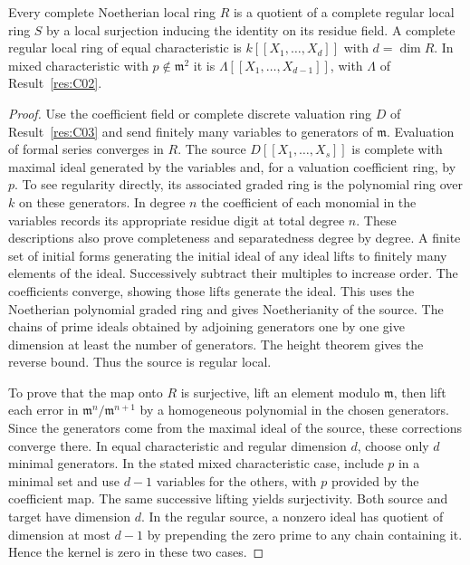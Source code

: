 \begin{theorem}\label{res:C04}
Every complete Noetherian local ring \(R\) is a quotient of a
complete regular local ring \(S\) by a local surjection inducing
the identity on its residue field. A complete regular local ring
of equal characteristic is \(k[[X_1,\ldots,X_d]]\) with \(d=\dim R\).
In mixed characteristic with \(p\notin\mathfrak m^2\) it is
\(\Lambda[[X_1,\ldots,X_{d-1}]]\), with \(\Lambda\) of
Result~\ref{res:C02}.
\end{theorem}
\begin{proof}
Use the coefficient field or complete discrete valuation ring \(D\)
of Result~\ref{res:C03} and send finitely many variables to generators
of \(\mathfrak m\). Evaluation of formal series converges in \(R\).
The source \(D[[X_1,\ldots,X_s]]\) is complete with maximal ideal
generated by the variables and, for a valuation coefficient ring,
by \(p\). To see regularity directly, its associated graded ring is
the polynomial ring over \(k\) on these generators. In degree \(n\)
the coefficient of each monomial in the variables records its
appropriate residue digit at total degree \(n\). These descriptions
also prove completeness and separatedness degree by degree.
A finite set of initial forms generating the initial ideal of any
ideal lifts to finitely many elements of the ideal. Successively
subtract their multiples to increase order. The coefficients
converge, showing those lifts generate the ideal. This uses the
Noetherian polynomial graded ring and gives Noetherianity of the
source. The chains of prime ideals obtained by adjoining generators
one by one give dimension at least the number of generators.
The height theorem gives the reverse bound. Thus the source is
regular local.

To prove that the map onto \(R\) is surjective, lift an element modulo
\(\mathfrak m\), then lift each error in
\(\mathfrak m^n/\mathfrak m^{n+1}\) by a homogeneous polynomial
in the chosen generators. Since the generators come from the
maximal ideal of the source, these corrections converge there.
In equal characteristic and regular dimension \(d\), choose only
\(d\) minimal generators. In the stated mixed characteristic case,
include \(p\) in a minimal set and use \(d-1\) variables for the
others, with \(p\) provided by the coefficient map. The same
successive lifting yields surjectivity. Both source and target have
dimension \(d\). In the regular source, a nonzero ideal has quotient
of dimension at most \(d-1\) by prepending the zero prime to any
chain containing it. Hence the kernel is zero in these two cases.
\end{proof}

